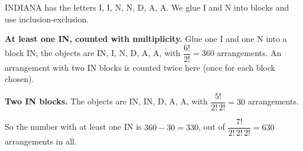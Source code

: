 INDIANA has the letters I, I, N, N, D, A, A. We glue I and N into blocks and use inclusion-exclusion.

\textbf{At least one IN, counted with multiplicity.} Glue one I and one N into a block IN; the objects are IN, I, N, D, A, A, with $\dfrac{6!}{2!}=360$ arrangements. An arrangement with two IN blocks is counted twice here (once for each block chosen).

\textbf{Two IN blocks.} The objects are IN, IN, D, A, A, with $\dfrac{5!}{2!\,2!}=30$ arrangements.

So the number with at least one IN is $360-30=\boxed{330}$, out of $\dfrac{7!}{2!\,2!\,2!}=630$ arrangements in all.
